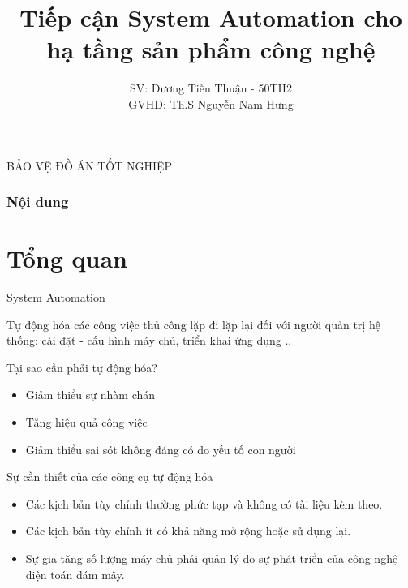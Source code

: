 \documentclass[14pt]{beamer}
\title[Tiếp cận System Automation cho hạ tầng sản phẩm công nghệ]{Tiếp cận System Automation cho hạ tầng sản phẩm công nghệ}
\author[Dương Tiến Thuận - 50TH2]{SV: Dương Tiến Thuận - 50TH2\\GVHD: Th.S Nguyễn Nam Hưng}
\begin{document}

\begin{frame}{BẢO VỆ ĐỒ ÁN TỐT NGHIỆP}
    \titlepage
\end{frame}

  \begin{frame}
    \frametitle{Nội dung}
    \tableofcontents
  \end{frame}

\section{Tổng quan}
\begin{frame}{System Automation}
  \begin{alertblock}\justifying
    \Large Tự động hóa các công việc thủ công lặp đi lặp lại đối với người quản trị hệ thống: cài đặt - cấu hình máy chủ, triển khai ứng dụng ..
  \end{alertblock}
\end{frame}

\begin{frame}{Tại sao cần phải tự động hóa?}
  \begin{alertblock}\justifying
  \begin{itemize}
  \item \Large Giảm thiểu sự nhàm chán
  \item \Large Tăng hiệu quả công việc
  \item \Large Giảm thiểu sai sót không đáng có do yếu tố con người
  \end{itemize}
  \end{alertblock}
\end{frame}

\begin{frame}{Sự cần thiết của các công cụ tự động hóa}
  \begin{itemize}
    \item Các kịch bản tùy chỉnh thường phức tạp và không có tài liệu kèm theo.
    \pause
    \item Các kịch bản tùy chỉnh ít có khả năng mở rộng hoặc sử dụng lại.
    \pause
    \item Sự gia tăng số lượng máy chủ phải quản lý do sự phát triển của công nghệ điện toán đám mây.
  \end{itemize}
\end{frame}
\end{document}
